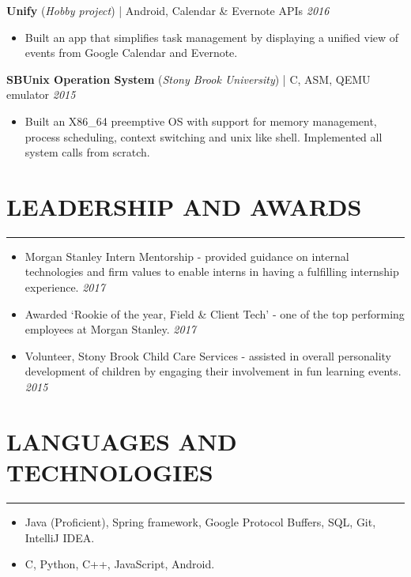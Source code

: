 \documentclass[12pt]{article}
\newcommand{\sectionHeading}[1]{
\section*{\small{#1}}
\vspace{-8pt}
\hrule
\vspace{8pt}
}
\newcommand {\projectSectionSubheading}[4]{
    \noindent \small{\textbf{#1} (\textit{#2}) | #3 \hfill \textit{#4}} \\
    \vspace{-20pt}
}
\newcommand{\sectionListStart}{
    \begin{itemize}[label={\small{\textbullet}}, leftmargin=20pt] %
}
\newcommand{\sectionListEnd}{\end{itemize}}
\newcommand{\sectionListItem}[1]{\item \small{#1}}
\newcommand{\sectionListItemWithDate}[2]{\item \small{#1 \hfill \textit{#2}} \\\vspace{-10pt}}
\begin{document}
\projectSectionSubheading{Unify}{Hobby project}{Android, Calendar \& Evernote APIs}{2016}
\sectionListStart
    \sectionListItem
        Built an app that simplifies task management by displaying a unified view of events from Google Calendar and Evernote.
\sectionListEnd

\projectSectionSubheading{SBUnix Operation System}{Stony Brook University}{C, ASM, QEMU emulator}{2015}
\sectionListStart
    \sectionListItem
        Built an X86\_64 preemptive OS with support for memory management, process scheduling, context switching and unix like shell. Implemented all system calls from scratch. 
        

\sectionListEnd

\sectionHeading{LEADERSHIP AND AWARDS}
\sectionListStart
    \sectionListItemWithDate
        {Morgan Stanley Intern Mentorship - provided guidance on internal technologies and firm values to enable interns in having a fulfilling internship experience.}{2017} 
    \sectionListItemWithDate
        {Awarded `Rookie of the year, Field \& Client Tech' - one of the top performing employees at Morgan Stanley.}{2017}
    \sectionListItemWithDate
        {Volunteer, Stony Brook Child Care Services - assisted in overall personality development of children by engaging their involvement in fun learning events.}{2015}
\sectionListEnd

\sectionHeading{LANGUAGES AND TECHNOLOGIES}
\sectionListStart
    \sectionListItem
        Java (Proficient), Spring framework, Google Protocol Buffers, SQL, Git, IntelliJ IDEA.
    \sectionListItem
        C, Python, C++, JavaScript, Android. 
\sectionListEnd

\end{document}
